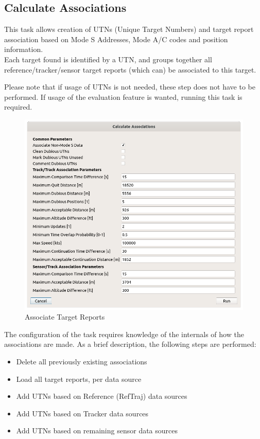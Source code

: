 \subsection{Calculate Associations}
\label{sec:ui_associate_tr}

This task allows creation of UTNs (Unique Target Numbers) and target report association based on Mode S Addresses, Mode A/C codes and position information. \\

Each target found is identified by a UTN, and groups together all reference/tracker/sensor target reports (which can) be associated to this target.

Please note that if usage of UTNs is not needed, these step does not have to be performed. If usage of the evaluation feature is wanted, running this task is required. \\

\begin{figure}[H]
  \center
    \includegraphics[width=16cm]{figures/tr_association_config.png}
  \caption{Associate Target Reports}
\end{figure}

The configuration of the task requires knowledge of the internals of how the associations are made. As a brief description, the following steps are performed:

\begin{itemize}
\item Delete all previously existing associations
\item Load all target reports, per data source
\item Add UTNs based on Reference (RefTraj) data sources
\item Add UTNs based on Tracker data sources
\item Add UTNs based on remaining sensor data sources
\end{itemize}
\ \\

